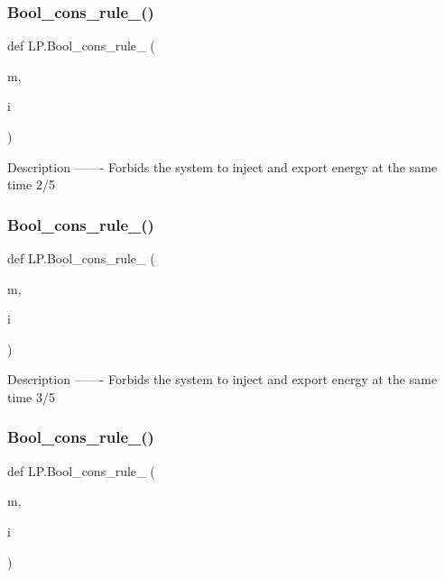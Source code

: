 \subsubsection{\texorpdfstring{Bool\+\_\+cons\+\_\+rule\+\_()}{Bool\_cons\_rule\_2()}}
{\footnotesize\ttfamily def L\+P.\+Bool\+\_\+cons\+\_\+rule\+\_ (\begin{DoxyParamCaption}\item[{}]{m,  }\item[{}]{i }\end{DoxyParamCaption})}

\begin{DoxyVerb}Description
-------
Forbids the system to inject and export energy at the same time 2/5
\end{DoxyVerb}
 \mbox{\label{namespace_l_p_a3d3409e76da5b5e02801ea5ba73dc7f1}} 
\subsubsection{\texorpdfstring{Bool\+\_\+cons\+\_\+rule\+\_()}{Bool\_cons\_rule\_3()}}
{\footnotesize\ttfamily def L\+P.\+Bool\+\_\+cons\+\_\+rule\+\_ (\begin{DoxyParamCaption}\item[{}]{m,  }\item[{}]{i }\end{DoxyParamCaption})}

\begin{DoxyVerb}Description
-------
Forbids the system to inject and export energy at the same time 3/5
\end{DoxyVerb}
 \mbox{\label{namespace_l_p_a9dda8c2199a8eba50bb01cdc929d37e5}} 
\subsubsection{\texorpdfstring{Bool\+\_\+cons\+\_\+rule\+\_()}{Bool\_cons\_rule\_4()}}
{\footnotesize\ttfamily def L\+P.\+Bool\+\_\+cons\+\_\+rule\+\_ (\begin{DoxyParamCaption}\item[{}]{m,  }\item[{}]{i }\end{DoxyParamCaption})}

